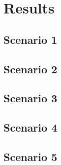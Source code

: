 \section{Results}

\subsection{Scenario 1}

\subsection{Scenario 2}

\subsection{Scenario 3}

\subsection{Scenario 4}

\subsection{Scenario 5}

